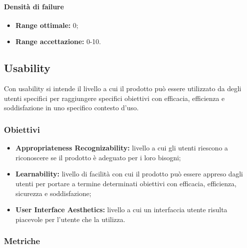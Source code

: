 			\paragraph{Densità di failure} \Spazio
			\begin{itemize}
				\item {\textbf{Range ottimale:} 0;}
				\item {\textbf{Range accettazione:} 0-10.}
			\end{itemize} 
			
	\subsection{Usability}
		Con usability si intende il livello a cui il prodotto può essere utilizzato da degli utenti specifici per raggiungere specifici obiettivi con efficacia, efficienza e soddisfazione in uno specifico contesto d'uso.  
		\subsubsection{Obiettivi}
		\begin{itemize}
			\item {\textbf{Appropriateness Recognizability:} livello a cui gli utenti riescono a riconoscere se il prodotto è adeguato per i loro bisogni;}
			\item {\textbf{Learnability:} livello di facilità con cui il prodotto può essere appreso dagli utenti per portare a termine determinati obiettivi con efficacia, efficienza, sicurezza e soddisfazione;} 
			\item {\textbf{User Interface Aesthetics:} livello a cui un interfaccia utente risulta piacevole per l'utente che la utilizza. }
			
		\end{itemize}
		\subsubsection{Metriche}
